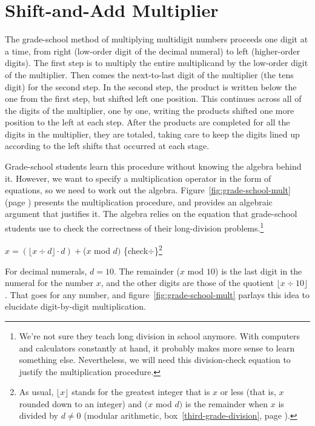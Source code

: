 \section{Shift-and-Add Multiplier}
\label{sec:bignum-mult}

The grade-school method of multiplying multidigit numbers proceeds one digit at a time,
from right (low-order digit of the decimal numeral) to left (higher-order digits).
The first step is to multiply the entire multiplicand by the low-order digit
of the multiplier.
Then comes the next-to-last digit of the multiplier (the tens digit) for the second step.
In the second step, the product is written below the one from the first step,
but shifted left one position.
This continues across all of the digits of the multiplier, one by one,
writing the products shifted one more position to the left at each step.
After the products are completed for
all the digits in the multiplier, they are totaled, taking care to keep
the digits lined up according to the left shifts that occurred at each stage.

Grade-school students learn this procedure
without knowing the algebra behind it.
However, we want to specify a
multiplication operator in the form of equations,
so we need to work out the algebra.
Figure~\ref{fig:grade-school-mult} (page \pageref{fig:grade-school-mult})
presents the multiplication procedure,
and provides an algebraic argument that justifies it.
The algebra relies on the equation
that grade-school students use to check the correctness of their long-division
problems.\footnote{We're not
sure they teach long division in school anymore.
With computers and calculators constantly at hand,
it probably makes more sense to learn something else.
Nevertheless, we will need this
division-check equation to justify the multiplication procedure.}

\hspace{2mm} $x = (\lfloor x \div d \rfloor \cdot d) + $($x$ mod $d)$ \hfill \{check$\div$\}\footnote{As usual,
$\lfloor x\rfloor$ stands for the greatest integer that is $x$ or less
(that is, $x$ rounded down to an integer)
and $(x$ mod $d)$ is the remainder when $x$ is divided by $d \neq 0$ (modular arithmetic,
box~\ref{third-grade-division}, page \pageref{third-grade-division}).}
\vspace{2mm}

For decimal numerals,  $d = 10$.
The remainder ($x$ mod $10$) is the last digit in the numeral for the number $x$,
and the other digits are those of the quotient $\lfloor x \div 10 \rfloor$.
That goes for any number, and
figure~\ref{fig:grade-school-mult}
parlays this idea to elucidate digit-by-digit multiplication.

